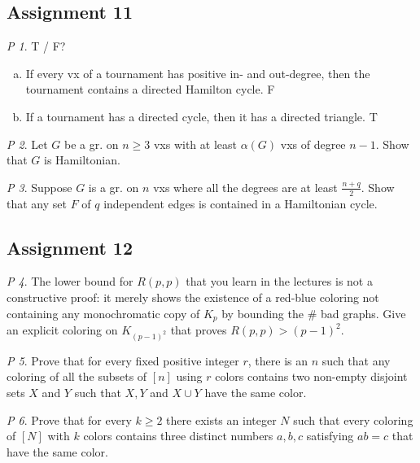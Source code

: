 \documentclass[11pt, fleqn, a4paper, landscape]{article}
\theoremstyle{plain} %
\theoremstyle{remark} %
\newtheorem{problem}{P}
\theoremstyle{definition} %
\begin{document}
\begin{multicols}{5}
\subsection{Assignment 11}

\begin{problem}
T / F?
\begin{enumerate}[(a)]
\item If every vx of a tournament has positive in- and out-degree, then the tournament contains a directed Hamilton cycle. F
\item If a tournament has a directed cycle, then it has a directed triangle. T
\end{enumerate} 
\end{problem}

\begin{problem}
Let $G$ be a gr. on $n \ge 3$ vxs with at least $\alpha(G)$ vxs of degree $n- 1$. Show that $G$ is Hamiltonian.
\end{problem}

\begin{problem}
Suppose $G$ is a gr. on $n$ vxs where all the degrees are at least $\frac{n+q}{2}$. Show that any set $F$ of $q$ independent edges is contained in a Hamiltonian cycle.
\end{problem}

\subsection{Assignment 12}

\begin{problem}
The lower bound for $R(p, p)$ that you learn in the lectures is not a constructive proof: it merely shows the existence of a red-blue coloring not containing any monochromatic copy of $K_p$ by bounding the \# bad graphs. Give an explicit coloring on $K_{(p-1)^2}$ that proves $R(p, p) > (p - 1)^2$.
\end{problem}

\begin{problem}
Prove that for every fixed positive integer $r$, there is an $n$ such that any coloring of all the subsets of $[n] $ using $r$ colors contains two non-empty disjoint sets $X$ and $Y$ such that $X, Y $ and $X \cup Y$ have the same color.
\end{problem}

\begin{problem}
Prove that for every $k \ge 2$ there exists an integer $N$ such that every coloring of $[N]$ with $k$ colors contains three distinct numbers $a, b, c$ satisfying $ab = c$ that have the same color.
\end{problem}


\end{multicols}
\end{document}
